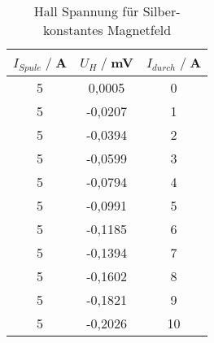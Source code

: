 \begin{table}
    \centering
    \begin{tabular}{c c c}
        \toprule
        $I_{Spule} \;/\;$A & $U_H\;/\;$mV & $I_{durch} \;/\;$A\\
        \midrule
  5                   &0,0005&              0\\
  5                   &-0,0207&             1\\
  5                   &-0,0394&             2\\
  5                   &-0,0599&             3\\
  5                   &-0,0794&             4\\
  5                   &-0,0991&             5\\
  5                   &-0,1185&             6\\
  5                   &-0,1394&             7\\
  5                   &-0,1602&             8\\
  5                   &-0,1821&             9\\
  5                   &-0,2026&             10\\

       \bottomrule
    \end{tabular}
    \caption{Hall Spannung für Silber- konstantes Magnetfeld}
    \label{tab:Ag_I}
\end{table}
